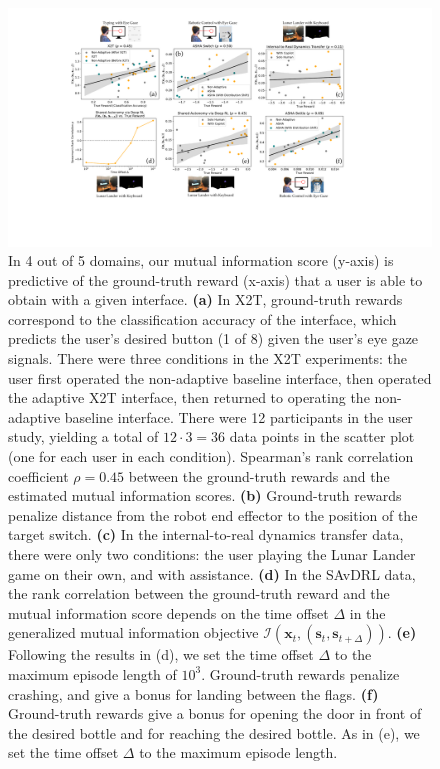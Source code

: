 \documentclass{article}
\newcommand{\bx}{\mathbf{x}}
\newcommand{\bs}{\mathbf{s}}
\newcommand{\mi}{\mathcal{I}}
\begin{document}
\begin{figure}[t]
    \centering
    \includegraphics[width=\linewidth]{offline-per-cond.pdf}
    \caption{In 4 out of 5 domains, our mutual information score (y-axis) is predictive of the ground-truth reward (x-axis) that a user is able to obtain with a given interface. \textbf{(a)} In X2T, ground-truth rewards correspond to the classification accuracy of the interface, which predicts the user's desired button (1 of 8) given the user's eye gaze signals. There were three conditions in the X2T experiments: the user first operated the non-adaptive baseline interface, then operated the adaptive X2T interface, then returned to operating the non-adaptive baseline interface. There were 12 participants in the user study, yielding a total of $12 \cdot 3 = 36$ data points in the scatter plot (one for each user in each condition). Spearman's rank correlation coefficient $\rho = 0.45$ between the ground-truth rewards and the estimated mutual information scores. \textbf{(b)} Ground-truth rewards penalize distance from the robot end effector to the position of the target switch. \textbf{(c)} In the internal-to-real dynamics transfer data, there were only two conditions: the user playing the Lunar Lander game on their own, and with assistance. \textbf{(d)} In the SAvDRL data, the rank correlation between the ground-truth reward and the mutual information score depends on the time offset $\Delta$ in the generalized mutual information objective $\mi(\bx_t, (\bs_t, \bs_{t+\Delta}))$. \textbf{(e)} Following the results in (d), we set the time offset $\Delta$ to the maximum episode length of $10^3$. Ground-truth rewards penalize crashing, and give a bonus for landing between the flags. \textbf{(f)} Ground-truth rewards give a bonus for opening the door in front of the desired bottle and for reaching the desired bottle. As in (e), we set the time offset $\Delta$ to the maximum episode length.}
    \label{fig:offline-per-cond}
\end{figure}
\end{document}
